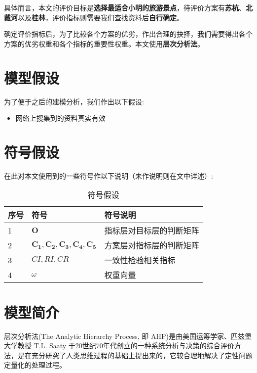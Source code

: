 \documentclass[withoutpreface]{cumcmthesis}
\begin{document}
    具体而言，本文的评价目标是\textbf{选择最适合小明的旅游景点}，待评价方案有\textbf{苏杭}、\textbf{北戴河}以及\textbf{桂林}，评价指标则需要我们查找资料后\textbf{自行确定}。

    确定评价指标后，为了比较各个方案的优劣，作出合理的抉择，我们需要得出各个方案的优劣权重和各个指标的重要性权重。本文使用\textbf{层次分析法}。

    \section{模型假设}

    为了便于之后的建模分析，我们作出以下假设:

    \begin{itemize}
        \item 网络上搜集到的资料真实有效
    \end{itemize}

    \section{符号假设}

    在此对本文使用到的一些符号作以下说明（未作说明则在文中详述）:

    \begin{table}[H]
        \centering
        \caption{符号假设}\label{Tab:12}
        \begin{tabular}{p{30pt}<{\centering}|p{100pt}<{\centering}@{}p{260pt}<{\centering}}
        \hline
        \rowcolor{color2} 序号 & 符号 & 符号说明 \\
        \hline
        \rowcolor{color1} 1 & $\mathbf{O}$		& 指标层对目标层的判断矩阵 \\
        \rowcolor{color1} 2 & $\mathbf{C_1,C_2,C_3,C_4,C_5}$		& 方案层对指标层的判断矩阵 \\
        \rowcolor{color1} 3 & $CI,RI,CR$		& 一致性检验相关指标\\
        \rowcolor{color1} 4 & $\omega$		& 权重向量 \\
        \hline
        \end{tabular}
    \end{table}

    \section{模型简介}

    层次分析法(The Analytic Hierarchy Process, 即 AHP)是由美国运筹学家、匹兹堡大学教授 T.L. Saaty 于20世纪70年代创立的一种系统分析与决策的综合评价方法，是在充分研究了人类思维过程的基础上提出来的，它较合理地解决了定性问题定量化的处理过程。
\end{document}
